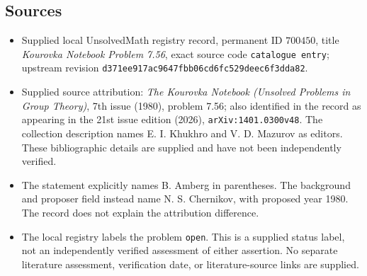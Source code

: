 \documentclass[11pt]{article}
\begin{document}
\subsection{Sources}
\begin{itemize}
\item Supplied local UnsolvedMath registry record, permanent ID \(700450\), title \emph{Kourovka Notebook Problem 7.56}, exact source code \texttt{catalogue entry}; upstream revision \texttt{d371ee917ac9647fbb06cd6fc529deec6f3dda82}.
\item Supplied source attribution: \emph{The Kourovka Notebook (Unsolved Problems in Group Theory)}, 7th issue (1980), problem 7.56; also identified in the record as appearing in the 21st issue edition (2026), \texttt{arXiv:1401.0300v48}. The collection description names E. I. Khukhro and V. D. Mazurov as editors. These bibliographic details are supplied and have not been independently verified.
\item The statement explicitly names B. Amberg in parentheses. The background and proposer field instead name N. S. Chernikov, with proposed year 1980. The record does not explain the attribution difference.
\item The local registry labels the problem \texttt{open}. This is a supplied status label, not an independently verified assessment of either assertion. No separate literature assessment, verification date, or literature-source links are supplied.
\end{itemize}
\end{document}
